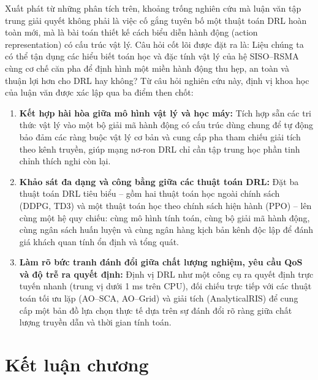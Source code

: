 Xuất phát từ những phân tích trên, khoảng trống nghiên cứu mà luận văn tập trung giải quyết không phải là
việc cố gắng tuyên bố một thuật toán DRL hoàn toàn mới, mà là bài toán thiết kế cách biểu diễn hành động
(action representation) có cấu trúc vật lý. Câu hỏi cốt lõi được đặt ra là: Liệu chúng ta có thể tận dụng
các hiểu biết toán học và đặc tính vật lý của hệ SISO--RSMA cùng cơ chế căn pha để định hình một miền hành
động thu hẹp, an toàn và thuận lợi hơn cho DRL hay không? Từ câu hỏi nghiên cứu này, định vị khoa học của
luận văn được xác lập qua ba điểm then chốt:
\begin{enumerate}
\item \textbf{Kết hợp hài hòa giữa mô hình vật lý và học máy:} Tích hợp sẵn các tri thức vật lý vào một bộ
  giải mã hành động có cấu trúc dùng chung để tự động bảo đảm các ràng buộc vật lý cơ bản và cung cấp pha
  tham chiếu giải tích theo kênh truyền, giúp mạng nơ-ron DRL chỉ cần tập trung học phần tinh chỉnh thích
  nghi còn lại.
\item \textbf{Khảo sát đa dạng và công bằng giữa các thuật toán DRL:} Đặt ba thuật toán DRL tiêu biểu -- gồm
  hai thuật toán học ngoài chính sách (DDPG, TD3) và một thuật toán học theo chính sách hiện hành (PPO) --
  lên cùng một hệ quy chiếu: cùng mô hình tính toán, cùng bộ giải mã hành động, cùng ngân sách huấn luyện và
  cùng ngân hàng kịch bản kênh độc lập để đánh giá khách quan tính ổn định và tổng quát.
\item \textbf{Làm rõ bức tranh đánh đổi giữa chất lượng nghiệm, yêu cầu QoS và độ trễ ra quyết định:} Định
  vị DRL như một công cụ ra quyết định trực tuyến nhanh (trung vị dưới 1 ms trên CPU), đối chiếu trực tiếp
  với các thuật toán tối ưu lặp (AO--SCA, AO--Grid) và giải tích (AnalyticalRIS) để cung cấp một bản đồ lựa
  chọn thực tế dựa trên sự đánh đổi rõ ràng giữa chất lượng truyền dẫn và thời gian tính toán.
\end{enumerate}

\section{Kết luận chương}
\label{sec:ket-luan-ch1}

